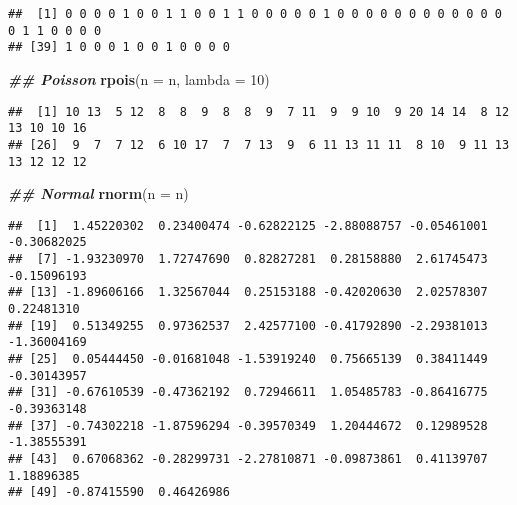 \documentclass[
]{article}
\newenvironment{Shaded}{\begin{snugshade}}{\end{snugshade}}
\newcommand{\AttributeTok}[1]{\textcolor[rgb]{0.13,0.29,0.53}{#1}}
\newcommand{\DecValTok}[1]{\textcolor[rgb]{0.00,0.00,0.81}{#1}}
\newcommand{\DocumentationTok}[1]{\textcolor[rgb]{0.56,0.35,0.01}{\textbf{\textit{#1}}}}
\newcommand{\FunctionTok}[1]{\textcolor[rgb]{0.13,0.29,0.53}{\textbf{#1}}}
\newcommand{\NormalTok}[1]{#1}
\begin{document}
\begin{verbatim}
##  [1] 0 0 0 0 1 0 0 1 1 0 0 1 1 0 0 0 0 0 1 0 0 0 0 0 0 0 0 0 0 0 0 0 1 1 0 0 0 0
## [39] 1 0 0 0 1 0 0 1 0 0 0 0
\end{verbatim}

\begin{Shaded}
\begin{Highlighting}[]
\DocumentationTok{\#\# Poisson}
\FunctionTok{rpois}\NormalTok{(}\AttributeTok{n =}\NormalTok{ n, }\AttributeTok{lambda =} \DecValTok{10}\NormalTok{)}
\end{Highlighting}
\end{Shaded}

\begin{verbatim}
##  [1] 10 13  5 12  8  8  9  8  8  9  7 11  9  9 10  9 20 14 14  8 12 13 10 10 16
## [26]  9  7  7 12  6 10 17  7  7 13  9  6 11 13 11 11  8 10  9 11 13 13 12 12 12
\end{verbatim}

\begin{Shaded}
\begin{Highlighting}[]
\DocumentationTok{\#\# Normal}
\FunctionTok{rnorm}\NormalTok{(}\AttributeTok{n =}\NormalTok{ n)}
\end{Highlighting}
\end{Shaded}

\begin{verbatim}
##  [1]  1.45220302  0.23400474 -0.62822125 -2.88088757 -0.05461001 -0.30682025
##  [7] -1.93230970  1.72747690  0.82827281  0.28158880  2.61745473 -0.15096193
## [13] -1.89606166  1.32567044  0.25153188 -0.42020630  2.02578307  0.22481310
## [19]  0.51349255  0.97362537  2.42577100 -0.41792890 -2.29381013 -1.36004169
## [25]  0.05444450 -0.01681048 -1.53919240  0.75665139  0.38411449 -0.30143957
## [31] -0.67610539 -0.47362192  0.72946611  1.05485783 -0.86416775 -0.39363148
## [37] -0.74302218 -1.87596294 -0.39570349  1.20444672  0.12989528 -1.38555391
## [43]  0.67068362 -0.28299731 -2.27810871 -0.09873861  0.41139707  1.18896385
## [49] -0.87415590  0.46426986
\end{verbatim}
\end{document}
